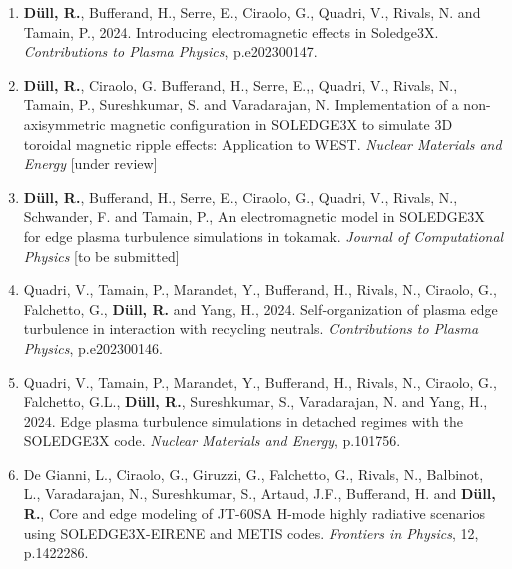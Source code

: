 \newpage
{}
\label{chap:publications}
\begin{enumerate}
\item \textbf{Düll, R.}, Bufferand, H., Serre, E., Ciraolo, G., Quadri, V., Rivals, N. and Tamain, P., 2024. Introducing electromagnetic effects in Soledge3X. \textit{Contributions to Plasma Physics}, p.e202300147.
\item \textbf{Düll, R.}, Ciraolo, G. Bufferand, H., Serre, E.,, Quadri, V., Rivals, N., Tamain, P., Sureshkumar, S. and Varadarajan, N. Implementation of a non-axisymmetric magnetic configuration in SOLEDGE3X to simulate 3D toroidal magnetic ripple effects: Application to WEST. \textit{Nuclear Materials and Energy} [under review]
\item \textbf{Düll, R.}, Bufferand, H., Serre, E., Ciraolo, G., Quadri, V., Rivals, N., Schwander, F. and Tamain, P., An electromagnetic model in SOLEDGE3X for edge plasma turbulence simulations in tokamak. \textit{Journal of Computational Physics} [to be submitted]
\item Quadri, V., Tamain, P., Marandet, Y., Bufferand, H., Rivals, N., Ciraolo, G., Falchetto, G., \textbf{Düll, R.} and Yang, H., 2024. Self‐organization of plasma edge turbulence in interaction with recycling neutrals. \textit{Contributions to Plasma Physics}, p.e202300146.
\item  Quadri, V., Tamain, P., Marandet, Y., Bufferand, H., Rivals, N., Ciraolo, G., Falchetto, G.L., \textbf{Düll, R.}, Sureshkumar, S., Varadarajan, N. and Yang, H., 2024. Edge plasma turbulence simulations in detached regimes with the SOLEDGE3X code. \textit{Nuclear Materials and Energy}, p.101756.
\item De Gianni, L., Ciraolo, G., Giruzzi, G., Falchetto, G., Rivals, N., Balbinot, L., Varadarajan, N., Sureshkumar, S., Artaud, J.F., Bufferand, H. and \textbf{Düll, R.}, Core and edge modeling of JT-60SA H-mode highly radiative scenarios using SOLEDGE3X-EIRENE and METIS codes. \textit{Frontiers in Physics}, 12, p.1422286.
\end{enumerate}

\newpage

